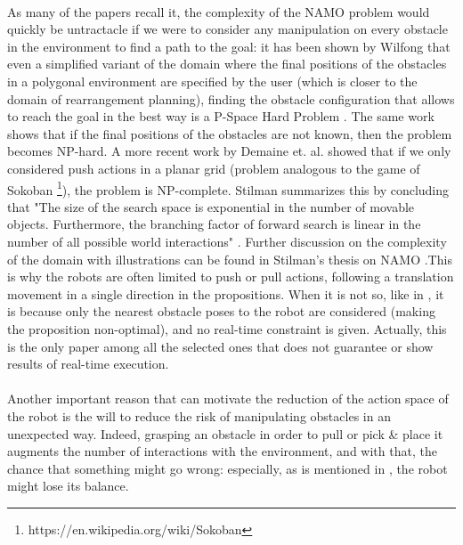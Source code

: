 \paragraph{} As many of the papers \parencite{stilman_navigation_2005, stilman_planning_2007, stilman_planning_2008, wu_navigation_2010, levihn_planning_2013, levihn_locally_2014, scholz_navigation_2016} recall it, the complexity of the NAMO problem would quickly be untractacle if we were to consider any manipulation on every obstacle in the environment to find a path to the goal: it has been shown by Wilfong that even a simplified variant of the domain where the final positions of the obstacles in a polygonal environment are specified by the user (which is closer to the domain of rearrangement planning), finding the obstacle configuration that allows to reach the goal in the best way is a P-Space Hard Problem \parencite{wilfong_motion_1991}. The same work shows that if the final positions of the obstacles are not known, then the problem becomes NP-hard. A more recent work by Demaine et. al. showed that if we only considered push actions in a planar grid (problem analogous to the game of Sokoban \footnote{https://en.wikipedia.org/wiki/Sokoban}), the problem is NP-complete. Stilman summarizes this by concluding that "The size of the search space is exponential in the number of movable objects. Furthermore, the branching factor of forward search is linear in the number of all possible world interactions" \parencite{stilman_planning_2008}. Further discussion on the complexity of the domain with illustrations can be found in Stilman's thesis on NAMO \parencite{stilman_navigation_2007}.This is why the robots are often limited to push or pull actions, following a translation movement in a single direction in the propositions. When it is not so, like in \parencite{okada_environment_2004}, it is because only the nearest obstacle poses to the robot are considered (making the proposition non-optimal), and no real-time constraint is given. Actually, this is the only paper among all the selected ones that does not guarantee or show results of real-time execution.

\paragraph{} Another important reason that can motivate the reduction of the action space of the robot is the will to reduce the risk of manipulating obstacles in an unexpected way. Indeed, grasping an obstacle in order to pull or pick \& place it augments the number of interactions with the environment, and with that, the chance that something might go wrong: especially, as is mentioned in \parencite{stilman_planning_2007}, the robot might lose its balance.

